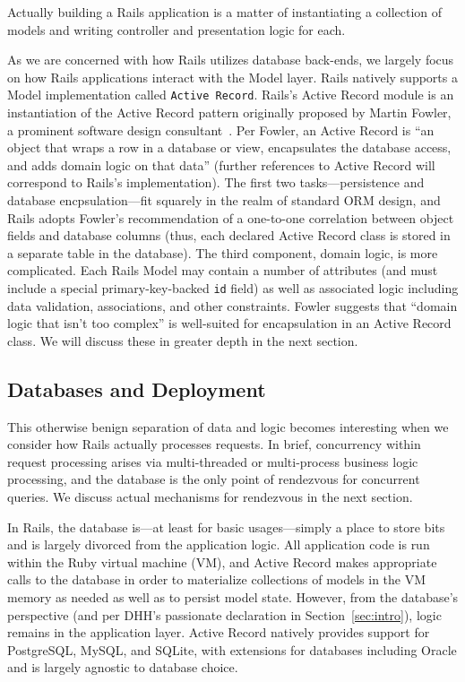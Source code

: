 Actually building a Rails application is a matter of instantiating a collection of models and writing controller and presentation logic for each.

As we are concerned with how Rails utilizes database back-ends, we largely focus on how Rails applications interact with the Model layer. Rails natively supports a Model implementation called \texttt{Active Record}. Rails's Active Record module is an instantiation of the Active Record pattern originally proposed by Martin Fowler, a prominent software design consultant~\cite{fowler-book}. Per Fowler, an Active Record is ``an object that wraps a row in a database or view, encapsulates the database access, and adds domain logic on that data'' (further references to Active Record will correspond to Rails's implementation). The first two tasks---persistence and database encpsulation---fit squarely in the realm of standard ORM design, and Rails adopts Fowler's recommendation of a one-to-one correlation between object fields and database columns (thus, each declared Active Record class is stored in a separate table in the database). The third component, domain logic, is more complicated. Each Rails Model may contain a number of attributes (and must include a special primary-key-backed \texttt{id} field) as well as associated logic including data validation, associations, and other constraints. Fowler suggests that ``domain logic that isn't too complex'' is well-suited for encapsulation in an Active Record class. We will discuss these in greater depth in the next section.

\subsection{Databases and Deployment}
\label{sec:deployment}

This otherwise benign separation of data and logic becomes interesting when we consider how Rails actually processes requests. In brief, concurrency within request processing arises via multi-threaded or multi-process business logic processing, and the database is the only point of rendezvous for concurrent queries. We discuss actual mechanisms for rendezvous in the next section.

In Rails, the database is---at least for basic usages---simply a place to store bits and is largely divorced from the application logic. All application code is run within the Ruby virtual machine (VM), and Active Record makes appropriate calls to the database in order to materialize collections of models in the VM memory as needed as well as to persist model state. However, from the database's perspective (and per DHH's passionate declaration in Section~\ref{sec:intro}), logic remains in the application layer. Active Record natively provides support for PostgreSQL, MySQL, and SQLite, with extensions for databases including Oracle and is largely agnostic to database choice.

